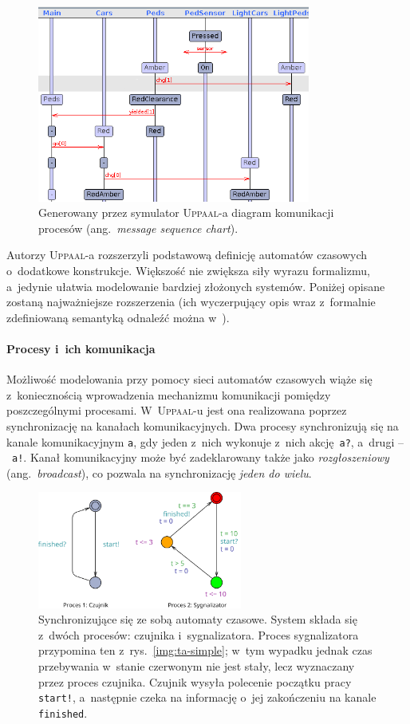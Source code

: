 \documentclass{pracamgr}
\newcommand{\ang}[1]{(ang.~\emph{#1})}
\newcommand{\imgr}[1]{rys.~\ref{#1}}
\newcommand{\upp}{\textsc{Uppaal}}
\theoremstyle{plain}
\begin{document}
\begin{figure}
  \centering
  \includegraphics[width=0.8\textwidth]{img/uppaal-msc.png}
  \caption{Generowany przez symulator \upp-a diagram komunikacji
    procesów \ang{message sequence chart}.}
  \label{img:uppaal-msc}
\end{figure}

Autorzy \upp-a rozszerzyli podstawową definicję automatów czasowych
o~dodatkowe konstrukcje. Większość nie zwiększa siły
wyrazu formalizmu, a~jedynie ułatwia modelowanie bardziej złożonych
systemów.  Poniżej opisane zostaną najważniejsze rozszerzenia
(ich wyczerpujący opis wraz z~formalnie zdefiniowaną semantyką
odnaleźć można w~\cite{by-lncs04}).
\paragraph{Procesy i~ich komunikacja} Możliwość modelowania przy
pomocy sieci automatów czasowych wiąże się z~koniecznością
wprowadzenia mechanizmu komunikacji pomiędzy poszczególnymi
procesami. W~\upp-u jest ona realizowana poprzez synchronizację na
kanałach komunikacyjnych. Dwa procesy synchronizują się na kanale
komunikacyjnym \texttt{a}, gdy jeden z~nich wykonuje z~nich
akcję~\texttt{a?}, a~drugi --~\texttt{a!}. Kanał komunikacyjny może
być zadeklarowany także jako \emph{rozgłoszeniowy} \ang{broadcast}, co
pozwala na synchronizację \emph{jeden do wielu}.
\begin{figure}
  \includegraphics[width=0.6\textwidth]{img/ta-communication}
  \caption[Synchronizujące się ze sobą automaty czasowe.]
  {Synchronizujące się ze sobą automaty czasowe. System składa się
    z~dwóch procesów: czujnika i~sygnalizatora. Proces sygnalizatora
    przypomina ten z~\imgr{img:ta-simple}; w~tym wypadku jednak czas
    przebywania w~stanie czerwonym nie jest stały, lecz wyznaczany
    przez proces czujnika. Czujnik wysyła polecenie początku pracy
    \texttt{start!}, a~następnie czeka na informację o~jej zakończeniu
    na kanale \texttt{finished}.}
\end{figure}
\end{document}

